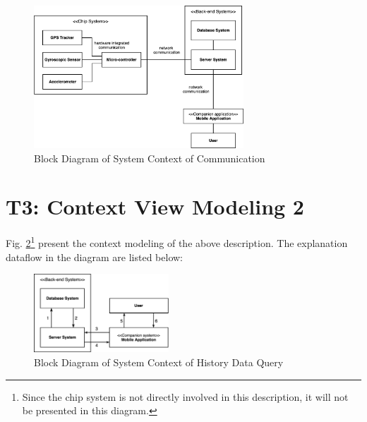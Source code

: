 \documentclass[conference]{IEEEtran}
\begin{document}
\begin{figure}[!ht]
	\centering
	\includegraphics[width=0.7\textwidth]{./img/sys-context-model.png}
	\caption{Block Diagram of System Context of Communication}
	\label{fig:sys-context-model}
\end{figure}

\section{T3: Context View Modeling 2}

\textit{}

Fig. \ref{fig:sys-context-model-2}\footnote{Since the chip system is not directly involved in this description, it will not be presented in this diagram.} present the context modeling of the above description.
The explanation dataflow in the diagram are listed below:

\begin{figure}[!ht]
	\centering
	\includegraphics[width=0.45\textwidth]{./img/sys-context-model-2.png}
	\caption{Block Diagram of System Context of History Data Query}
	\label{fig:sys-context-model-2}
\end{figure}
\end{document}
